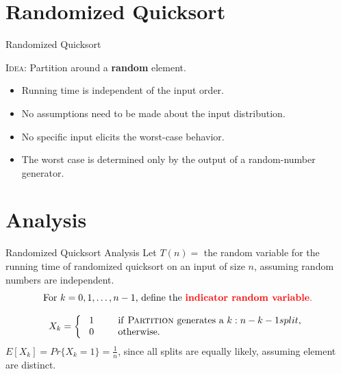\documentclass{beamer}
\begin{document}
\section{Randomized Quicksort}

\begin{frame}{Randomized Quicksort}
    \begin{alertblock}{\textsc{Idea:}}
        Partition around a \textbf{random} element.
    \end{alertblock}
    \begin{itemize}
        \item Running time is independent of the input order.
        \item No assumptions need to be made about the input distribution.
        \item No specific input elicits the worst-case behavior.
        \item The worst case is determined only by the output of a random-number generator.
    \end{itemize}
\end{frame}

\section{Analysis}

\begin{frame}{Randomized Quicksort Analysis}
    Let $T(n) = $ the random variable for the running time of randomized quicksort on an input of size $n$, assuming random numbers are independent.
    $$
        \text{For } k = 0, 1, \ldots, n - 1\text{, define the \textcolor{red}{\textbf{indicator random variable}.}}
    $$

    $$
        X_k = \left\{
            \begin{array}{l l}
                \text{ 1 \text{\hspace{3mm}}} & \text{ if \textsc{Partition} generates a } k: n-k-1 split\text{,} \\
                \text{ 0 \text{\hspace{3mm}}} & \text{ otherwise.} \\
            \end{array}
        \right.
    $$
$E[X_k] = Pr\{X_k = 1\} = \frac{1}{n}$, since all splits are equally likely, assuming element are distinct.
\end{frame}
\end{document}
